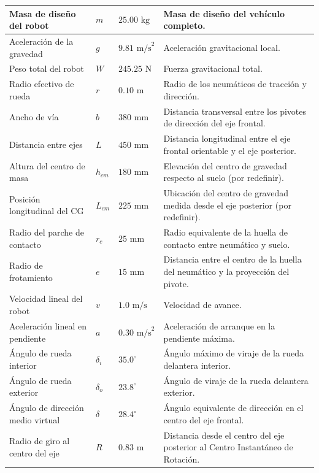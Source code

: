 \documentclass[../../General.tex]{subfiles}
\begin{document}
\begin{center}
\begin{xltabular}{\textwidth}{|p{3.5cm}|>{\centering\arraybackslash}p{2.5cm}|>{\centering\arraybackslash}p{2.5cm}|>{\centering\arraybackslash}X|}
        Masa de diseño del robot & $m$ & $25.00\text{ kg}$ & Masa de diseño del vehículo completo. \\ \hline
        Aceleración de la gravedad & $g$ & $9.81\text{ m/s}^2$ & Aceleración gravitacional local. \\ \hline
        Peso total del robot & $W$ & $245.25\text{ N}$ & Fuerza gravitacional total. \\ \hline
        Radio efectivo de rueda & $r$ & $0.10\text{ m}$ & Radio de los neumáticos de tracción y dirección. \\ \hline
        Ancho de vía & $b$ & $380\text{ mm}$ & Distancia transversal entre los pivotes de dirección del eje frontal. \\ \hline
        Distancia entre ejes & $L$ & $450\text{ mm}$ & Distancia longitudinal entre el eje frontal orientable y el eje posterior. \\ \hline
        Altura del centro de masa & $h_{cm}$ & $180\text{ mm}$ & Elevación del centro de gravedad respecto al suelo (por redefinir). \\ \hline
        Posición longitudinal del CG & $L_{cm}$ & $225\text{ mm}$ & Ubicación del centro de gravedad medida desde el eje posterior (por redefinir). \\ \hline
        Radio del parche de contacto & $r_c$ & $25\text{ mm}$ & Radio equivalente de la huella de contacto entre neumático y suelo. \\ \hline
        Radio de frotamiento & $e$ & $15\text{ mm}$ & Distancia entre el centro de la huella del neumático y la proyección del pivote. \\ \hline
        Velocidad lineal del robot & $v$ & $1.0\text{ m/s}$ & Velocidad de avance. \\ \hline
        Aceleración lineal en pendiente & $a$ & $0.30\text{ m/s}^2$ & Aceleración de arranque en la pendiente máxima. \\ \hline
        Ángulo de rueda interior & $\delta_i$ & $35.0^\circ$ & Ángulo máximo de viraje de la rueda delantera interior. \\ \hline
        Ángulo de rueda exterior & $\delta_o$ & $23.8^\circ$ & Ángulo de viraje de la rueda delantera exterior. \\ \hline
        Ángulo de dirección medio virtual & $\delta$ & $28.4^\circ$ & Ángulo equivalente de dirección en el centro del eje frontal. \\ \hline
        Radio de giro al centro del eje & $R$ & $0.83\text{ m}$ & Distancia desde el centro del eje posterior al Centro Instantáneo de Rotación. \\ \hline

\end{xltabular}
\end{center}
\end{document}
